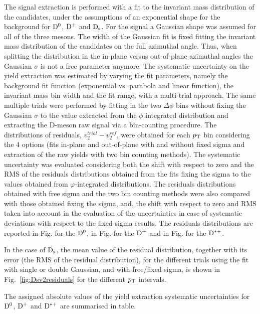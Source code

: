 The signal extraction is performed with a fit to the invariant mass
distribution of the candidates, under the assumptions of an
exponential shape for the background for ${\rm D^0}$, ${\rm D^+}$ and ${\rm D_s}$. For the signal a Gaussian shape was assumed for all of the three mesons.  
The width of the Gaussian fit is fixed fitting the invariant mass distribution of the candidates on the full azimuthal angle. Thus, when splitting the distribution in the in-plane versus out-of-plane azimuthal angles the Gaussian $\sigma$ is not a free parameter anymore. 
The systematic uncertainty on the yield extraction was estimated by varying the fit parameters, namely the background fit function
(exponential vs. parabola and linear function), the invariant mass bin
width and the fit range, with a multi-trial approach. The same multiple
trials were performed by fitting in the two
$\Delta\phi$ bins without fixing the Gaussian $\sigma$ to the value
extracted from the $\phi$ integrated distribution and extracting the
D-meson raw signal via a bin-counting procedure. The distributions of
residuals, $v_2^{trial}-v_2^{ref}$, were obtained for each $p_{\rm T}$ bin
considering the 4 options (fits in-plane and out-of-plane with and
without fixed sigma and extraction of the raw yields with two bin
counting methods). The systematic uncertainty was evaluated
considering both the shift with respect to zero and the RMS of the residuals
distributions obtained from the fits fixing the sigma to the values
obtained from $\varphi$-integrated distributions. The residuals
distributions obtained with free sigma and the two bin counting
methods were also compared with those obtained fixing the sigma, and, the
shift with respect to zero and RMS taken into account in the
evaluation of the uncertainties in case of systematic deviations with
respect to the fixed sigma results.
The residuals distributions are reported in Fig. for the ${\rm D^0}$, in Fig. for the ${\rm D^+}$ and  in Fig. for the ${\rm D^{*+}}$. 

 In the case of ${\rm D_s}$, the mean value of the residual distribution, together with its error (the RMS of the residual distribution), for the different trials using the fit with single or double Gaussian, and with free/fixed sigma, is shown in Fig.~\ref{fig:Dsv2residuals} for the different $p_{\rm T}$ intervals.

The assigned absolute values of the yield extraction systematic uncertainties for ${\rm D^0}$, ${\rm D^+}$ and ${\rm D^{*+}}$ are summarised in table.


